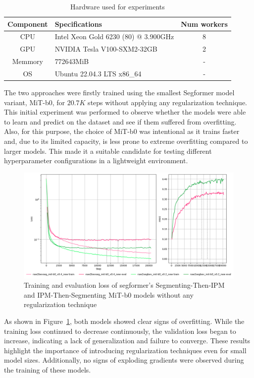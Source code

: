 \begin{table}[!ht]
    \centering
    \begin{tabular}{c l c}
        \toprule
        \textbf{Component} & \textbf{Specifications} & \textbf{Num workers} \\
        \midrule
        CPU         & Intel Xeon Gold 6230 (80) @ 3.900GHz & 8 \\
        GPU         & NVIDIA Tesla V100-SXM2-32GB & 2 \\      
        Memmory     & 772643MiB & - \\
        OS          & Ubuntu 22.04.3 LTS x86\_64 & - \\
        \bottomrule
    \end{tabular}
    \caption{ Hardware used for experiments }
    \label{tab:hardware}
\end{table}

The two approaches were firstly trained using the smallest Segformer model variant, MiT-b0, for $20.7K$ steps without applying any regularization technique. This initial experiment was performed to observe whether the models were able to learn and predict on the dataset and see if them suffered from overfitting. Also, for this purpose, the choice of MiT-b0 was intentional as it trains faster and, due to its limited capacity, is less prone to extreme overfitting compared to larger models. This made it a suitable candidate for testing different hyperparameter configurations in a lightweight environment.

\begin{figure}[!ht]
    \centering
    \includegraphics[width=0.7\linewidth]{./images/experiments/overfitting_bev_nu.png}
    \caption{Training and evaluation loss of segformer's Segmenting-Then-IPM and IPM-Then-Segmenting MiT-b0 models without any regularization technique}
    \label{fig:overfitting_mit-b0}
\end{figure}

As shown in Figure~\ref{fig:overfitting_mit-b0}, both models showed clear signs of overfitting. While the training loss continued to decrease continuously, the validation loss began to increase, indicating a lack of generalization and failure to converge. These results highlight the importance of introducing regularization techniques even for small model sizes. Additionally, no signs of exploding gradients were observed during the training of these models. 

